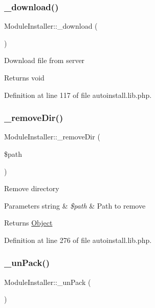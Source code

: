 \subsubsection{\texorpdfstring{\+\_\+download()}{\_download()}}
{\footnotesize\ttfamily Module\+Installer\+::\+\_\+download (\begin{DoxyParamCaption}{ }\end{DoxyParamCaption})}

Download file from server

\begin{DoxyReturn}{Returns}
void 
\end{DoxyReturn}


Definition at line 117 of file autoinstall.\+lib.\+php.

\mbox{\label{classModuleInstaller_a1d67a0ab016c393b15df54dabff74e9b}} 
\subsubsection{\texorpdfstring{\+\_\+remove\+Dir()}{\_removeDir()}}
{\footnotesize\ttfamily Module\+Installer\+::\+\_\+remove\+Dir (\begin{DoxyParamCaption}\item[{}]{\$path }\end{DoxyParamCaption})}

Remove directory


\begin{DoxyParams}[1]{Parameters}
string & {\em \$path} & Path to remove \\
\hline
\end{DoxyParams}
\begin{DoxyReturn}{Returns}
\hyperlink{classObject}{Object} 
\end{DoxyReturn}


Definition at line 276 of file autoinstall.\+lib.\+php.

\mbox{\label{classModuleInstaller_a4b669f44350c27a508c2aac3180836f6}} 
\subsubsection{\texorpdfstring{\+\_\+un\+Pack()}{\_unPack()}}
{\footnotesize\ttfamily Module\+Installer\+::\+\_\+un\+Pack (\begin{DoxyParamCaption}{ }\end{DoxyParamCaption})}

